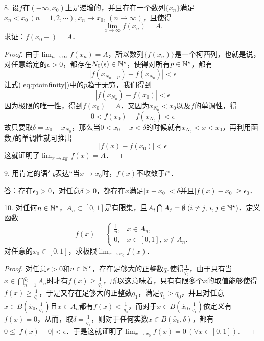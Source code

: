 8. 设$f$在$(-\infty, x_0)$上是递增的，并且存在一个数列$\{ x_n \}$满足$x_n < x_0 \, (n = 1,2,\cdots), x_n \to x_0, \, (n \to \infty)$，且使得
\begin{equation}
    \lim_{x \to \infty} f(x_n) = A.
\end{equation}
求证：$f(x_0 -) = A$．

\begin{proof}
由于$\displaystyle\lim_{n \to \infty} f(x_n) = A$，所以数列$\{ f(x_n) \}$是一个柯西列，也就是说，对任意给定的$\epsilon > 0$，都存在$N_0(\epsilon) \in \mathbb{N}^\star$，使得对所有$p \in \mathbb{N}^\star$，都有
\begin{equation}
    |f(x_{N_0+p}) - f(x_{N_0})|<\epsilon
    \label{eq:ptoinfinity}
\end{equation}
让式(\ref{eq:ptoinfinity})中的$p$趋于无穷，我们得到
\begin{equation}
    |f(x_{N_0}) - f(x_0)|<\epsilon
\end{equation}
因为极限的唯一性，得到$f(x_0)=A$．又因为$x_{N_0}<x_0$以及$f$的单调性，得
\begin{equation}
    0 < f(x_0) - f(x_{N_0}) < \epsilon
\end{equation}
故只要取$\delta = x_0 - x_{N_0}$，那么当$0 < x_0 - x < \delta$的时候就有$x_{N_0}<x<x_0$，再利用函数$f$的单调性就可推出
\begin{equation}
    |f(x)-f(x_0)|<\epsilon
\end{equation}
这就证明了$\displaystyle\lim_{x \to x_0^-} f(x) = A$．
\end{proof}

9. 用肯定的语气表达``当$x \to x_0$时，$f(x)$不收敛于$l$''．

答：存在$\epsilon_0 > 0$，对任意$\delta > 0$，都存在$x$满足$|x-x_0|<\delta$并且$|f(x)-x_0|\geq\epsilon_0$．

10. 对任何$n \in \mathbb{N}^\star$，$A_n \subset [0,1]$是有限集，且$A_i \bigcap A_j = \emptyset \; (i \neq j, \, i,j \in \mathbb{N}^\star)$．定义函数
\begin{equation}
    f(x) = \begin{cases}
        \displaystyle\frac{1}{n}, & x \in A_n , \\
        0, & x \in [0,1], \, x \not\in A_n.
    \end{cases}
\end{equation}
对任意的$x_0 \in [0,1]$，求极限$\displaystyle\lim_{x \to x_0} f(x)$．

\begin{proof}
对任意$\epsilon > 0$和$n \in \mathbb{N}^\star$，存在足够大的正整数$q_0$使得$\displaystyle\frac{1}{q_0}$，由于只有当$x \in \displaystyle\bigcap_{n=1}^{q_0} A_n$时才有$f(x) \geq \displaystyle\frac{1}{q_0}$，所以这意味着，只有有限多个$x$的取值能够使得$f(x) \geq \displaystyle\frac{1}{q_0}$，于是又存在足够大的正整数$q_1$，满足$q_1 > q_0$，并且对任意$x \in B(\check{x_0}, \displaystyle\frac{1}{q_1})$且$x \in A_n$都有$f(x) < \displaystyle\frac{1}{q_0}$，而对于$x \in B(\check{x_0}, \displaystyle\frac{1}{q_1})$依定义有$f(x) = 0$，从而，取$\delta = \displaystyle\frac{1}{q_1}$，则对于任何实数$x \in B(\check{x_0}, \delta)$，都有$0 \leq |f(x) - 0| < \epsilon$．于是这就证明了$\displaystyle\lim_{x \to x_0} f(x) = 0 \, (\forall x \in [0,1])$．
\end{proof}

